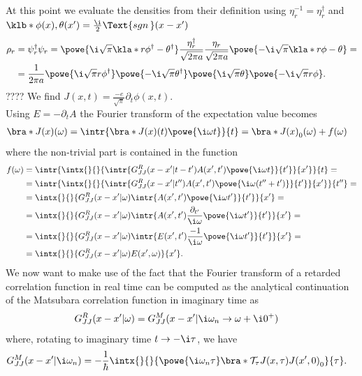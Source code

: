 \documentclass[english, parskip=full]{scrartcl}
\begin{document}
At this point we evaluate the densities from their definition using $\eta_r^{-1} = \eta_r^\dagger$ and $\klb*{\phi(x),\theta(x')} = \frac{\i}{2} \Text{sgn\,}(x-x')$
\begin{align}
\rho_r &= \psi_r^\dagger \psi_r = \powe{\i \sqrt{\pi} \kla*{r\phi^\dagger - \theta^\dagger} } \frac{\eta_r^\dagger}{\sqrt{2\pi a}} \frac{\eta_r}{\sqrt{2\pi a}} \powe{-\i \sqrt{\pi} \kla*{r\phi - \theta}} = \\
&= \frac{1}{2\pi a} \powe{\i\sqrt{\pi}r\phi^\dagger} \powe{-\i\sqrt{\pi} \theta^\dagger} \powe{\i\sqrt{\pi}\theta} \powe{-\i\sqrt{\pi} r\phi}.
\end{align}
????
We find $J(x,t) = \frac{-e}{\sqrt{\pi}} \partial_t\phi(x,t)$.\\
Using $E=-\partial_tA$ the Fourier transform of the expectation value becomes
\begin{align}
\bra*{J(x)}(\omega) &= \intr{\bra*{J(x)}(t) \powe{\i\omega t}}{t} = \bra*{J(x)}_0(\omega) + f(\omega)
\end{align}
where the non-trivial part is contained in the function
\begin{align}
f(\omega) &= \intr{\intx{ }{ }{\intr{G_{JJ}^R(x-x'|t-t') A(x',t') \powe{\i\omega t}}{t'}}{x'}}{t} = \\
&= \intr{\intx{ }{ }{\intr{G_{JJ}^R(x-x'|t'') A(x',t') \powe{\i\omega (t''+t')}}{t'}}{x'}}{t''} = \\
&= \intx{ }{ }{G_{JJ}^R(x-x'|\omega) \intr{A(x',t') \powe{\i\omega t'}}{t'}}{x'} = \\
&= \intx{ }{ }{G_{JJ}^R(x-x'|\omega) \intr{A(x',t') \frac{\partial_{t'} }{\i\omega} \powe{\i\omega t'}}{t'}}{x'} = \\
&= \intx{ }{ }{G_{JJ}^R(x-x'|\omega) \intr{E(x',t') \frac{-1}{\i\omega}  \powe{\i\omega t'}}{t'}}{x'} = \\
&= \intx{ }{ }{G_{JJ}^R(x-x'|\omega) E(x',\omega)}{x'}.
\end{align}
We now want to make use of the fact that the Fourier transform of a retarded correlation function in real time can be computed as the analytical continuation of the Matsubara correlation function in imaginary time as 
\begin{align}
G_{JJ}^R(x-x'|\omega) &= G_{JJ}^M (x-x'|\i\omega_n \rightarrow\omega + \i 0^+)
\end{align}
where, rotating to imaginary time $t\rightarrow -\i\tau$, we have
\begin{align}
G_{JJ}^M(x-x'|\i\omega_n) &= -\frac{1}{\hbar} \intx{ }{ }{\powe{\i\omega_n\tau } \bra*{\mathcal{T}_\tau J(x,\tau) J(x',0)}_0}{\tau}.
\end{align}
\end{document}

